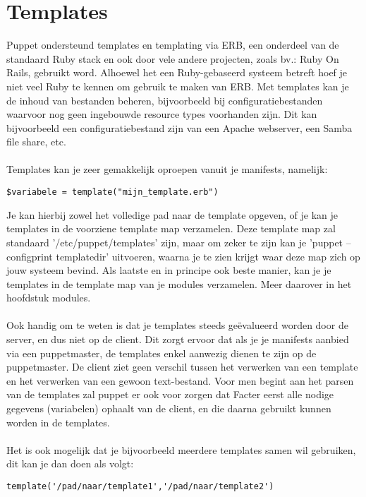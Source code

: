 \chapter{Templates}

Puppet ondersteund templates en templating via ERB, een onderdeel van de standaard Ruby stack en ook door vele andere projecten, zoals bv.: Ruby On Rails, gebruikt word. Alhoewel het een Ruby-gebaseerd systeem betreft hoef je niet veel Ruby te kennen om gebruik te maken van ERB. Met templates kan je de inhoud van bestanden beheren, bijvoorbeeld bij configuratiebestanden waarvoor nog geen ingebouwde resource types voorhanden zijn. Dit kan bijvoorbeeld een configuratiebestand zijn van een Apache webserver, een Samba file share, etc.\\\\
Templates kan je zeer gemakkelijk oproepen vanuit je manifests, namelijk:
%
\begin{code}
\begin{lstlisting}
$variabele = template("mijn_template.erb")
\end{lstlisting}
\end{code}
%
Je kan hierbij zowel het volledige pad naar de template opgeven, of je kan je templates in de voorziene template map verzamelen. Deze template map zal standaard '/etc/puppet/templates' zijn, maar om zeker te zijn kan je 'puppet --configprint templatedir' uitvoeren, waarna je te zien krijgt waar deze map zich op jouw systeem bevind. Als laatste en in principe ook beste manier, kan je je templates in de template map van je modules verzamelen. Meer daarover in het hoofdstuk modules.\\\\
Ook handig om te weten is dat je templates steeds ge\"{e}valueerd worden door de server, en dus niet op de client. Dit zorgt ervoor dat als je je manifests aanbied via een puppetmaster, de templates enkel aanwezig dienen te zijn op de puppetmaster. De client ziet geen verschil tussen het verwerken van een template en het verwerken van een gewoon text-bestand. Voor men begint aan het parsen van de templates zal puppet er ook voor zorgen dat Facter eerst alle nodige gegevens (variabelen) ophaalt van de client, en die daarna gebruikt kunnen worden in de templates.\\\\
Het is ook mogelijk dat je bijvoorbeeld meerdere templates samen wil gebruiken, dit kan je dan doen als volgt:
%
\begin{code}
\begin{lstlisting}
template('/pad/naar/template1','/pad/naar/template2')
\end{lstlisting}
\end{code}
%
